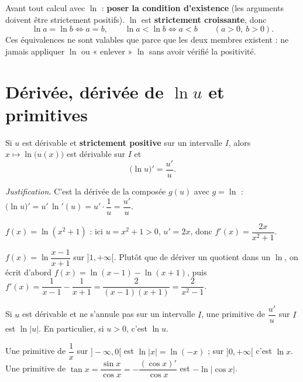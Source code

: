 \begin{aretenir}
Avant tout calcul avec $\ln$ : \textbf{poser la condition d'existence} (les arguments
doivent être strictement positifs). $\ln$ est \textbf{strictement croissante}, donc
\[
\ln a=\ln b\iff a=b,\qquad \ln a<\ln b\iff a<b\qquad(a>0,\ b>0).
\]
Ces équivalences ne sont valables que parce que les deux membres existent : ne jamais
appliquer $\ln$ ou « enlever » $\ln$ sans avoir vérifié la positivité.
\end{aretenir}

\section{Dérivée, dérivée de $\ln u$ et primitives}

\begin{propriete}[Dérivée de $\ln u$]
Si $u$ est dérivable et \textbf{strictement positive} sur un intervalle $I$, alors
$x\mapsto\ln\big(u(x)\big)$ est dérivable sur $I$ et
\[
\big(\ln u\big)'=\frac{u'}{u}.
\]
\end{propriete}

\noindent\textit{Justification.} C'est la dérivée de la composée $g(u)$ avec $g=\ln$ :
$\big(\ln u\big)'=u'\,\ln'(u)=u'\cdot\dfrac1u=\dfrac{u'}{u}$.

\begin{exemple}
$f(x)=\ln(x^{2}+1)$ : ici $u=x^{2}+1>0$, $u'=2x$, donc $f'(x)=\dfrac{2x}{x^{2}+1}$.
\end{exemple}

\begin{exemple}
$f(x)=\ln\dfrac{x-1}{x+1}$ sur $]1,+\infty[$. Plutôt que de dériver un quotient dans un
$\ln$, on écrit d'abord $f(x)=\ln(x-1)-\ln(x+1)$, puis
$f'(x)=\dfrac1{x-1}-\dfrac1{x+1}=\dfrac{2}{(x-1)(x+1)}=\dfrac{2}{x^{2}-1}$.
\end{exemple}

\begin{propriete}
Si $u$ est dérivable et ne s'annule pas sur un intervalle $I$, une primitive de
$\dfrac{u'}{u}$ sur $I$ est $\ln|u|$. En particulier, si $u>0$, c'est $\ln u$.
\end{propriete}

\begin{exemple}
Une primitive de $\dfrac{1}{x}$ sur $]-\infty,0[$ est $\ln|x|=\ln(-x)$ ; sur $]0,+\infty[$
c'est $\ln x$. Une primitive de $\tan x=\dfrac{\sin x}{\cos x}=-\dfrac{(\cos x)'}{\cos x}$ est
$-\ln|\cos x|$.
\end{exemple}

